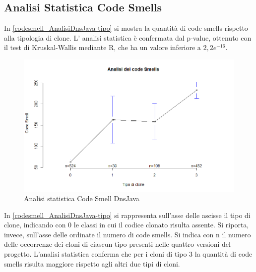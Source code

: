 \subsection{Analisi Statistica Code Smells}
In \autoref{codesmell_AnalisiDnsJava-tipo} si mostra la quantità di code smells rispetto alla tipologia di clone. L' analisi statistica è confermata dal p-value, ottenuto con il test di Kruskal-Wallis mediante R, che ha un valore inferiore a $2,2 e^{-16}$. \newpage
\begin{figure}[htbp]
	\centering
	\includegraphics[scale=0.5]{analisi_R/AnalisiDnsJava/2-gplot-codesmell-type.png}
\caption{Analisi statistica Code Smell DnsJava}
\label{codesmell_AnalisiDnsJava-tipo}
\end{figure}
In \autoref{codesmell_AnalisiDnsJava-tipo}  si rappresenta sull'asse delle ascisse il tipo di clone, indicando con 0 le classi in cui il codice clonato risulta assente. Si riporta, invece, sull'asse delle ordinate il numero di code smells. Si indica con n il numero delle occorrenze dei cloni di ciascun tipo presenti nelle quattro versioni del progetto. L'analisi statistica conferma che per i cloni di tipo 3 la quantità di code smells risulta maggiore rispetto agli altri due tipi di cloni.

